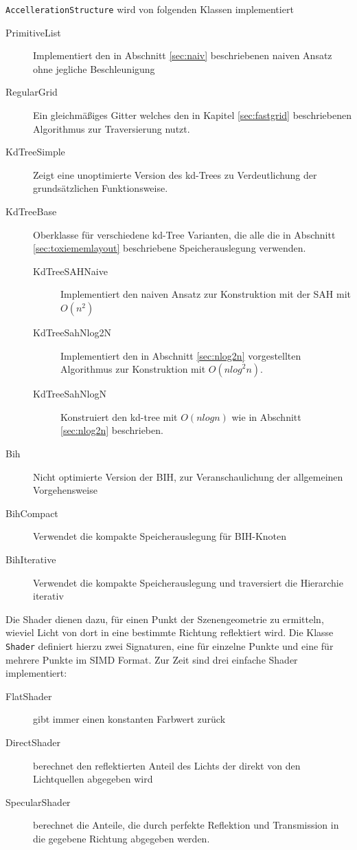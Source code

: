\verb|AccellerationStructure| wird von folgenden Klassen implementiert
\begin{description}
 \item[PrimitiveList]Implementiert den in Abschnitt \ref{sec:naiv} beschriebenen naiven Ansatz ohne jegliche Beschleunigung
 \item[RegularGrid]Ein gleichmäßiges Gitter welches den in Kapitel \ref{sec:fastgrid} beschriebenen Algorithmus zur Traversierung nutzt.
 \item[KdTreeSimple]Zeigt eine unoptimierte Version des kd-Trees zu Ver\-deut\-lich\-ung der grund\-sätz\-lich\-en Funktionsweise.
 \item[KdTreeBase]Oberklasse für verschiedene kd-Tree Varianten, die alle die in Abschnitt \ref{sec:toxiememlayout} beschriebene Speicherauslegung verwenden.
\begin{description}
 \item[KdTreeSAHNaive]Implementiert den naiven Ansatz zur Konstruktion mit der SAH mit $O(n^2)$
 \item[KdTreeSahNlog2N]Implementiert den in Abschnitt \ref{sec:nlog2n} vorgestellten Algorithmus zur Konstruktion mit $O(n {log}^2n)$.
\item[KdTreeSahNlogN]Konstruiert den kd-tree mit $O(n {log} n)$ wie in Abschnitt \ref{sec:nlog2n} beschrieben.
 \end{description}
\item[Bih]Nicht optimierte Version der BIH, zur Veranschaulichung der allgemeinen Vorgehensweise
\item[BihCompact]Verwendet die kompakte Speicherauslegung für BIH-Knoten
\item[BihIterative]Verwendet die kompakte Speicherauslegung und traversiert die Hierarchie iterativ
 \end{description}

Die Shader dienen dazu, für einen Punkt der Szenengeometrie zu ermitteln, wieviel Licht von dort in eine bestimmte Richtung reflektiert wird. Die Klasse \verb|Shader| definiert hierzu zwei Signaturen, eine für einzelne Punkte und eine für mehrere Punkte im SIMD Format. Zur Zeit sind drei einfache Shader implementiert:
\begin{description}
 \item[FlatShader]gibt immer einen konstanten Farbwert zurück
 \item[DirectShader]berechnet den reflektierten Anteil des Lichts der direkt von den Lichtquellen abgegeben wird
 \item[SpecularShader]berechnet die Anteile, die durch perfekte Reflektion und Transmission in die gegebene Richtung abgegeben werden.
 \end{description}

